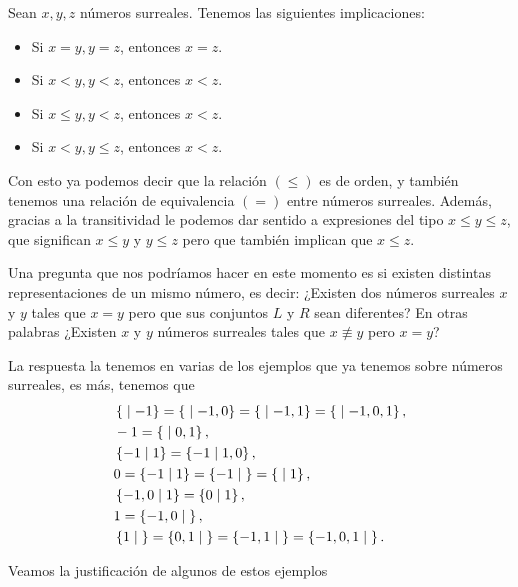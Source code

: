     \begin{corollary}
        Sean $x,y,z$ n\'umeros surreales. Tenemos las siguientes implicaciones:

        \begin{itemize}[nosep]
            \item Si $x = y, y = z$, entonces $x = z$.
            \item Si $x < y, y < z$, entonces $x < z$.
            \item Si $x \le y, y < z$, entonces $x < z$.
            \item Si $x < y, y \le z$, entonces $x < z$.
        \end{itemize}
    \end{corollary}

    Con esto ya podemos decir que la relaci\'on $(\le)$ es de orden, y tambi\'en tenemos una relaci\'on de equivalencia $(=)$ entre n\'umeros surreales. Adem\'as, gracias a la transitividad le podemos dar sentido a expresiones del tipo $x \le y \le z$, que significan $x\le y$ y $y\le z$ pero que tambi\'en implican que $x \le z$.

    Una pregunta que nos podr\'iamos hacer en este momento es si existen distintas representaciones de un mismo n\'umero, es decir: ¿Existen dos n\'umeros surreales $x$ y $y$ tales que $x=y$ pero que sus conjuntos $L$ y $R$ sean diferentes? En otras palabras ¿Existen $x$ y $y$ n\'umeros surreales tales que $x\not\equiv y$ pero $x = y$?

    La respuesta la tenemos en varias de los ejemplos que ya tenemos sobre n\'umeros surreales, es m\'as, tenemos que
    \begin{align*}
        &\left\{\;\middle|\; -1\right\} = \left\{\;\middle|\; -1,0\right\} = \left\{\;\middle|\; -1,1\right\} = \left\{\;\middle|\; -1,0,1\right\}, \\
        &-1 = \left\{\;\middle|\; 0,1\right\},\\
        &\left\{-1\;\middle|\; 1\right\} = \left\{-1\;\middle|\; 1,0\right\},\\
        &0 = \left\{-1\;\middle|\; 1\right\} = \left\{-1\;\middle|\; \right\} = \left\{\;\middle|\; 1\right\},\\
        &\left\{-1,0\;\middle|\; 1\right\} = \left\{0\;\middle|\; 1\right\},\\
        &1 = \left\{-1,0\;\middle|\; \right\},\\
        &\left\{1\;\middle|\; \right\} = \left\{0,1\;\middle|\; \right\} = \left\{-1,1\;\middle|\; \right\} = \left\{-1,0,1\;\middle|\; \right\}.
    \end{align*}

    Veamos la justificaci\'on de algunos de estos ejemplos


